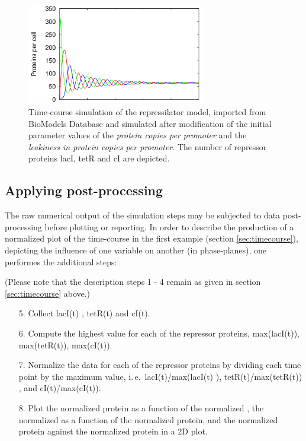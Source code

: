 \begin{figure}[ht]
	\centering
	\includegraphics[width=0.7\textwidth]{examples/repressilator/rep_pre.png}
	\caption{Time-course simulation of the repressilator model, imported from BioModels Database and simulated after modification of the initial parameter values of the \emph{protein copies per promoter} and the \emph{leakiness in protein copies per promoter}. The number of repressor proteins lacI, tetR and cI are depicted.}
	\label{fig:rep_pre}
\end{figure}

\subsection{Applying post-processing}
\label{sec:postprocessing}
The raw numerical output of the simulation steps may be subjected to data post-processing before plotting or reporting. In order to describe the production of a normalized plot of the time-course in the first example (section \ref{sec:timecourse}), depicting the influence of one variable on another (in phase-planes), one performes the additional steps:

(Please note that the description steps 1 - 4 remain as given in section \ref{sec:timecourse} above.)
\begin{enumerate}
	\item[5.]{Collect lacI(t) , tetR(t) and cI(t).}
	\item[6.]{Compute the highest value for each of the repressor proteins, max(lacI(t)), max(tetR(t)), max(cI(t)).}
	\item[7.]{Normalize the data for each of the repressor proteins by dividing each time point by the maximum value, i.\,e.\ lacI(t)/max(lacI(t) ), tetR(t)/max(tetR(t)) , and cI(t)/max(cI(t)).}
	\item[8.]{Plot the normalized  protein as a function of the normalized , the normalized   as a function of the normalized  protein, and the normalized  protein against the normalized  protein in a 2D plot.}
\end{enumerate}

